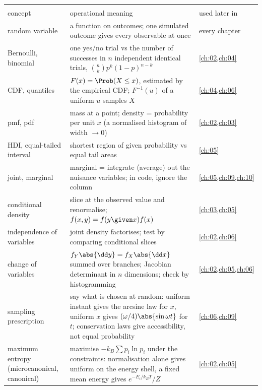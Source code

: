 \begin{center}
\small
\renewcommand{\arraystretch}{1.15}
\begin{tabularx}{\linewidth}{@{}>{\raggedright\arraybackslash}p{3.3cm}
                               >{\raggedright\arraybackslash}X
                               >{\raggedright\arraybackslash}p{2.7cm}@{}}
\toprule
\multicolumn{3}{@{}l}{\textbf{Random variables and their summaries}}\\
concept & operational meaning & used later in\\\midrule
random variable & a function on outcomes; one simulated outcome gives every
  observable at once & every chapter\\
Bernoulli, binomial & one yes/no trial vs the number of successes in $n$ independent identical trials, $\binom nkp^k(1-p)^{n-k}$ & \cref{ch:02,ch:04}\\
CDF, quantiles & $F(x)=\Prob(X\le x)$, estimated by the empirical CDF;
  $F^{-1}(u)$ of a uniform $u$ samples $X$ & \cref{ch:04,ch:06}\\
pmf, pdf & mass at a point; density = probability per unit $x$ (a
  normalised histogram of width $\to0$) & \cref{ch:02,ch:03}\\
HDI, equal-tailed interval & shortest region of given probability vs equal
  tail areas & \cref{ch:05}\\
joint, marginal & marginal = integrate (average) out the nuisance variables;
  in code, ignore the column & \cref{ch:05,ch:09,ch:10}\\
conditional density & slice at the observed value and renormalise;
  $f(x,y)=f(y\given x)f(x)$ & \cref{ch:03,ch:05}\\
independence of variables & joint density factorises; test by comparing
  conditional slices & \cref{ch:02,ch:06}\\
change of variables & $f_Y\abs{\dd y}=f_X\abs{\dd x}$ summed over branches;
  Jacobian determinant in $n$ dimensions; check by histogramming & \cref{ch:02,ch:05,ch:06}\\
sampling prescription & say what is chosen at random: uniform instant gives the
  arcsine law for $x$, uniform $x$ gives $(\omega/4)\abs{\sin\omega t}$ for $t$;
  conservation laws give accessibility, not equal probability & \cref{ch:06,ch:09}\\
maximum entropy (microcanonical, canonical) & maximise $-k_B\sum p_i\ln p_i$ under the
  constraints: normalisation alone gives uniform on the energy shell, a fixed mean
  energy gives $e^{-E_i/k_BT}/Z$ & \cref{ch:02,ch:05}\\

\end{tabularx}
\end{center}
